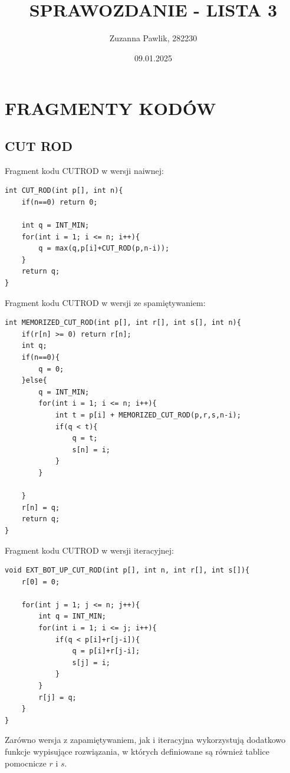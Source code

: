 \documentclass{article}
\title{SPRAWOZDANIE - LISTA 3}
\author{Zuzanna Pawlik, 282230}
\date{09.01.2025}
\begin{document}
\maketitle
	
\section*{FRAGMENTY KODÓW}
\subsection*{CUT ROD}
Fragment kodu CUTROD w wersji naiwnej:
\begin{verbatim}
int CUT_ROD(int p[], int n){
    if(n==0) return 0;

    int q = INT_MIN;
    for(int i = 1; i <= n; i++){
        q = max(q,p[i]+CUT_ROD(p,n-i));
    }
    return q;
}
\end{verbatim}
Fragment kodu CUTROD w wersji ze spamiętywaniem: 
\begin{verbatim}
int MEMORIZED_CUT_ROD(int p[], int r[], int s[], int n){
    if(r[n] >= 0) return r[n];
    int q;
    if(n==0){
        q = 0;
    }else{
        q = INT_MIN;
        for(int i = 1; i <= n; i++){
            int t = p[i] + MEMORIZED_CUT_ROD(p,r,s,n-i);
            if(q < t){
                q = t;
                s[n] = i;
            }
        }
        
    }
    r[n] = q;
    return q;
}

\end{verbatim}
Fragment kodu CUTROD w wersji iteracyjnej:	
\begin{verbatim}
void EXT_BOT_UP_CUT_ROD(int p[], int n, int r[], int s[]){
    r[0] = 0;

    for(int j = 1; j <= n; j++){
        int q = INT_MIN;
        for(int i = 1; i <= j; i++){
            if(q < p[i]+r[j-i]){
                q = p[i]+r[j-i];
                s[j] = i;
            }
        }
        r[j] = q;
    }
}
\end{verbatim}
Zarówno wersja z zapamiętywaniem, jak i iteracyjna wykorzystują dodatkowo funkcje wypisujące rozwiązania, w których definiowane są również tablice pomocnicze $r$ i $s$.
\end{document}
